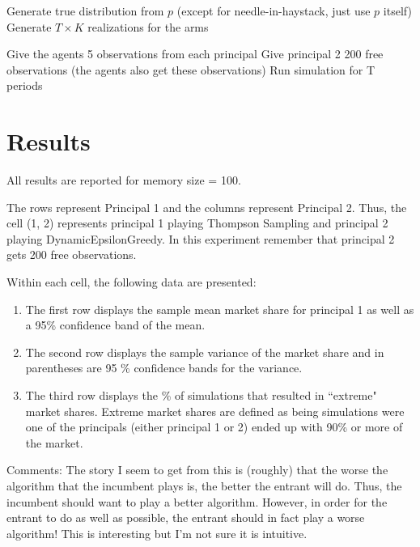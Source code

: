 \documentclass[11pt,letterpaper]{article}
\begin{document}
\begin{algorithm}
\begin{algorithmic}[1]
\State Generate true distribution from $p$ (except for needle-in-haystack, just use $p$ itself)
\State Generate $T \times K$ realizations for the arms 
				
				\State Give the agents 5 observations from each principal
				\State Give principal 2 200 free observations (the agents also get these observations)
				\State Run simulation for T periods
			\EndFor
		\EndFor
	\EndFor
\EndFor
\end{algorithmic}
\end{algorithm}

\section*{Results}
All results are reported for memory size = 100. \\
\vspace{0.25cm}

The rows represent Principal 1 and the columns represent Principal 2. Thus, the cell (1, 2) represents principal 1 playing Thompson Sampling and principal 2 playing DynamicEpsilonGreedy. In this experiment remember that principal 2 gets 200 free observations.  \\
\vspace{0.1cm}

Within each cell, the following data are presented: \\

\begin{enumerate}
\item The first row displays the sample mean market share for principal 1 as well as a 95\% confidence band of the mean.

\item The second row displays the sample variance of the market share and in parentheses are 95 \% confidence bands for the variance.

\item The third row displays the \% of simulations that resulted in ``extreme" market shares. Extreme market shares are defined as being simulations were one of the principals (either principal 1 or 2) ended up with 90\% or more of the market.
\end{enumerate}


Comments: The story I seem to get from this is (roughly) that the worse the algorithm that the incumbent plays is, the better the entrant will do. Thus, the incumbent should want to play a better algorithm. However, in order for the entrant to do as well as possible, the entrant should in fact play a worse algorithm! This is interesting but I'm not sure it is intuitive.
\end{document}
